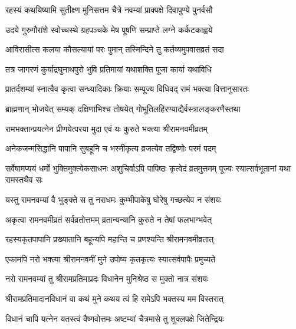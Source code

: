 \twolineshloka
{रहस्यं कथयिष्यामि सुतीक्ष्ण मुनिसत्तम}
{चैत्रे नवम्यां प्राक्पक्षे दिवापुण्ये पुनर्वसौ}%

\twolineshloka
{उदये गुरुगौरांशे स्वोच्चस्थे ग्रहपञ्चके}
{मेष पूषणि सम्प्राप्ते लग्ने कर्कटकाह्वये}%

\twolineshloka
{आविरासीत्स कलया कौसल्यायां परः पुमान्}
{तस्मिन्दिने तु कर्तव्यमुपवासव्रतं सदा}%

\twolineshloka
{तत्र जागरणं कुर्याद्रघुनाथपुरो भुवि}%
{प्रतिमायां यथाशक्ति पूजा कार्या यथाविधि}%

\twolineshloka
{प्रातर्दशम्यां स्नात्वैव कृत्वा सन्ध्यादिकाः क्रियाः}
{सम्पूज्य विधिवद् रामं भक्त्या वित्तानुसारतः}%

\twolineshloka
{ब्राह्मणान् भोजयेत् सम्यक् दक्षिणाभिश्च तोषयेत्}
{गोभूतिलहिरण्याद्यैर्वस्त्रालङ्करणैस्तथा}%

\twolineshloka
{रामभक्तान्प्रयत्नेन प्रीणयेत्परया मुदा}
{एवं यः कुरुते भक्त्या श्रीरामनवमीव्रतम्}%

\twolineshloka
{अनेकजन्मसिद्धानि पापानि सुबहूनि च}
{भस्मीकृत्य व्रजत्येव तद्विष्णोः परमं पदम्}%

\threelineshloka
{सर्वेषामप्ययं धर्मो भुक्तिमुक्त्येकसाधनः}
{अशुचिर्वाऽपि पापिष्ठः कृत्वेदं व्रतमुत्तमम्}
{पूज्यः स्यात्सर्वभूतानां यथा रामस्तथैव सः}%

\twolineshloka
{यस्तु रामनवम्यां वै भुङ्क्ते स तु नराधमः}
{कुम्भीपाकेषु घोरेषु गच्छत्येव न संशयः}%

\twolineshloka
{अकृत्वा रामनवमीव्रतं सर्वव्रतोत्तमम्}
{व्रतान्यन्यानि कुरुते न तेषां फलभाग्भवेत्}%

\twolineshloka
{रहस्यकृतपापानि प्रख्यातानि बहून्यपि}
{महान्ति च प्रणश्यन्ति श्रीरामनवमीव्रतात्}%

\twolineshloka
{एकामपि नरो भक्त्या श्रीरामनवमीं मुने}
{उपोष्य कृतकृत्यः स्यात्सर्वपापैः प्रमुच्यते}%

\twolineshloka
{नरो रामनवम्यां तु श्रीरामप्रतिमाप्रदः}
{विधानेन मुनिश्रेष्ठ स मुक्तो नात्र संशयः}%

\twolineshloka
{श्रीरामप्रतिमादानविधानं वा कथं मुने}
{कथय त्वं हि रामेऽपि भक्तस्य मम विस्तरात्}%


\twolineshloka
{विधानं चापि यत्नेन यतस्त्वं वैष्णवोत्तमः}
{अष्टम्यां चैत्रमासे तु शुक्लपक्षे जितेन्द्रियः}%

